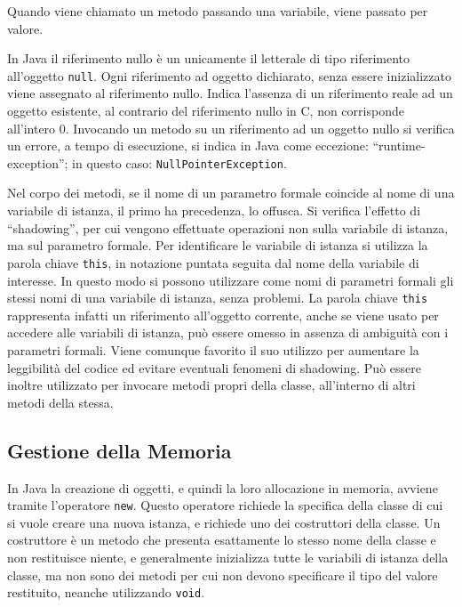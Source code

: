 \documentclass{article}
\numberwithin{equation}{subsection}
\begin{document}
Quando viene chiamato un metodo passando una variabile, viene passato per valore. 

In Java il riferimento nullo è un unicamente il letterale di tipo riferimento all'oggetto \verb|null|. Ogni riferimento ad oggetto dichiarato, senza essere inizializzato 
viene assegnato al riferimento nullo. Indica l'assenza di un riferimento reale ad un oggetto esistente, al contrario del riferimento nullo in C, non corrisponde all'intero $0$. 
Invocando un metodo su un riferimento ad un oggetto nullo si verifica un errore, a tempo di esecuzione, si indica in Java come eccezione: ``runtime-exception''; in questo caso: 
\verb|NullPointerException|. 

Nel corpo dei metodi, se il nome di un parametro formale coincide al nome di una variabile di istanza, il primo ha precedenza, lo offusca. Si verifica l'effetto di ``shadowing'', per cui 
vengono effettuate operazioni non sulla variabile di istanza, ma sul parametro formale. Per identificare le variabile di istanza si utilizza la parola chiave \verb|this|, in notazione 
puntata seguita dal nome della variabile di interesse. In questo modo si possono utilizzare come nomi di parametri formali gli stessi nomi di una variabile di istanza, senza 
problemi. 
La parola chiave \verb|this| rappresenta infatti un riferimento all'oggetto corrente, anche se viene usato per accedere alle variabili di istanza, può essere omesso in assenza di ambiguità 
con i parametri formali. Viene comunque favorito il suo utilizzo per aumentare la leggibilità del codice ed evitare eventuali fenomeni di shadowing. 
Può essere inoltre utilizzato per invocare metodi propri della classe, all'interno di altri metodi della stessa. 

\subsection{Gestione della Memoria}

In Java la creazione di oggetti, e quindi la loro allocazione in memoria, avviene tramite l'operatore \verb|new|. Questo operatore richiede la specifica della classe di cui si 
vuole creare una nuova istanza, e richiede uno dei costruttori della classe. 
Un costruttore è un metodo che presenta esattamente lo stesso nome della classe e non restituisce niente, e generalmente inizializza tutte le variabili di istanza della classe, ma non 
sono dei metodi per cui non devono specificare il tipo del valore restituito, neanche utilizzando \verb|void|.  
\end{document}
